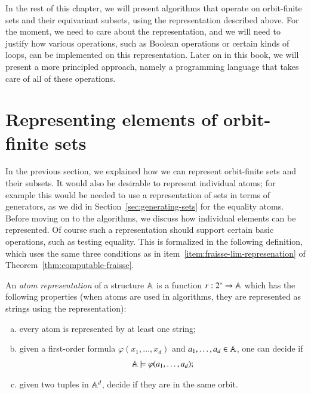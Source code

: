 In the rest of this chapter, we will present algorithms that operate on orbit-finite sets and their equivariant subsets, using the representation described above. For the moment, we need to care about the representation, and we will need to justify how various operations, such as Boolean operations or certain kinds of loops, can be implemented on this representation. Later on in this book, we will present a more principled approach, namely a programming language that takes care of all of these operations.



\section{Representing elements of orbit-finite sets}
\label{sec:generating-elements-oligo} 
In the previous section, we explained how we can represent orbit-finite sets and their subsets. It would also be desirable to represent individual atoms; for example this would be needed to use a representation of sets in terms of generators, as we did in Section~\ref{sec:generating-sets} for the equality atoms. 
Before moving on to the algorithms, we discuss how individual elements can be represented. Of course such a representation should support certain basic operations, such as testing equality. This is formalized in the following definition, which uses the same three conditions as in item~\ref{item:fraisse-lim-represenation} of Theorem~\ref{thm:computable-fraisse}.

\begin{definition}
	\label{def:atom-representation}
	An \emph{atom representation} of a structure $\mathbb A$ is a function $r  : 2^* \to \mathbb A$ which has the following properties (when atoms are used in algorithms, they are represented as strings using the representation):
	\begin{enumerate}[(a)]
		\item \label{item:atom-representation-every-atom-represented}  every atom is represented by at least one string;
		\item  \label{item:atom-representation-fo-theory-decidable} given a first-order formula $\varphi(x_1,\ldots,x_d)$ and $a_1,\ldots,a_d \in \mathbb A$, one can decide if 
		\begin{align*}
		\mathbb A \models \varphi(a_1,\ldots,a_d);
		\end{align*}
		\item  \label{item:atom-representation-decide-same-orbit} given two tuples in $\mathbb A^d$,  decide if they are in the same orbit.
	\end{enumerate}
\end{definition}

